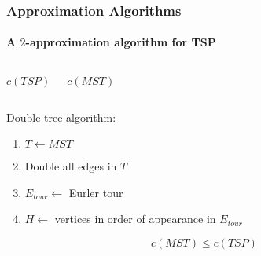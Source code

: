 \documentclass[smaller,aspectratio=169,ignorenonframetext,compress,sans,fleqn,xcolor=dvipsnames,fleqn,table,stillsansserifmath,stillsansseriftext,stillsansserifsmall,stillsansseriflarge]{beamer}
\newcommand{\plotpoints}{
  \draw node[point] (a) at (1,2) {};%
  \draw node[point] (b) at (3,0) {};%
  \draw node[point] (c) at (4,1) {};%
  \draw node[point] (d) at (7,0) {};%
  \draw node[point] (e) at (6,2) {};%
  \draw node[point] (f) at (7,4) {};%
  \draw node[point] (g) at (3,4) {};%
}
\begin{document}
\begin{frame}%

\frametitle{Approximation Algorithms}
\framesubtitle{A $2$-approximation algorithm for TSP}

\begin{columns}[T,onlytextwidth]

  \centering
  \begin{center}
    $c(TSP)$
  \end{center}
  \centering
   \begin{center}
    $c(MST)$
  \end{center}
\end{columns}

\bigskip

\begin{overprint}

\begin{framed}
Double tree algorithm:
\medskip
\begin{enumerate}
\item $T\leftarrow MST$
\item Double all edges in $T$
\item  $E_{tour} \leftarrow$ Eurler tour
\item $H\leftarrow$ vertices in order of appearance in $E_{tour}$
\end{enumerate}
\end{framed}

\begin{center}
\[
c(MST)\leq c(TSP)
\]
\end{center}

\end{overprint}

\end{frame}
\end{document}
